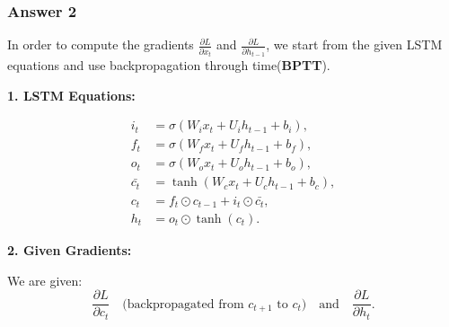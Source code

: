 \subsubsection*{Answer 2}

In order to compute the gradients \(\frac{\partial L}{\partial x_t}\) and \(\frac{\partial L}{\partial h_{t-1}}\), we start from the given LSTM equations and use backpropagation through time(\textbf{BPTT}). 

\textbf{1. LSTM Equations:}

\[
\begin{aligned}
i_t &= \sigma(W_i x_t + U_i h_{t-1} + b_i), \\
f_t &= \sigma(W_f x_t + U_f h_{t-1} + b_f), \\
o_t &= \sigma(W_o x_t + U_o h_{t-1} + b_o), \\
\bar{c_t} &= \tanh(W_c x_t + U_c h_{t-1} + b_c), \\
c_t &= f_t \odot c_{t-1} + i_t \odot \bar{c_t}, \\
h_t &= o_t \odot \tanh(c_t).
\end{aligned}
\]

\textbf{2. Given Gradients:}

We are given:
\[
\frac{\partial L}{\partial c_t} \quad \text{(backpropagated from } c_{t+1} \text{ to } c_t\text{)} \quad \text{and} \quad \frac{\partial L}{\partial h_t}.
\]

